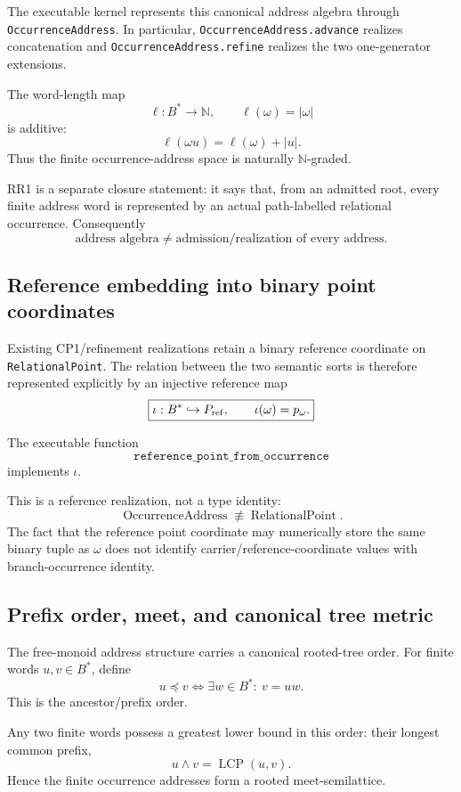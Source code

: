 \documentclass[11pt]{article}
\newcommand{\codeid}[1]{\nolinkurl{#1}}
\begin{document}
The executable kernel represents this canonical address algebra through
\texttt{OccurrenceAddress}. In particular,
\codeid{OccurrenceAddress.advance} realizes concatenation and
\codeid{OccurrenceAddress.refine} realizes the two one-generator extensions.

The word-length map
\[
\ell:B^*\to\mathbb N,
\qquad
\ell(\omega)=|\omega|
\]
is additive:
\[
\boxed{
\ell(\omega u)
=
\ell(\omega)+|u|.
}
\]
Thus the finite occurrence-address space is naturally \(\mathbb N\)-graded.

RR1 is a separate closure statement: it says that, from an admitted root,
every finite address word is represented by an actual path-labelled
relational occurrence. Consequently
\[
\boxed{
\text{address algebra}
\neq
\text{admission/realization of every address}.
}
\]

\subsection{Reference embedding into binary point coordinates}

Existing CP1/refinement realizations retain a binary reference coordinate on
\texttt{RelationalPoint}. The relation between the two semantic sorts is
therefore represented explicitly by an injective reference map
\[
\boxed{
\iota:
B^*
\hookrightarrow
P_{\rm ref},
\qquad
\iota(\omega)=p_\omega.
}
\]

The executable function
\[
\texttt{reference\_point\_from\_occurrence}
\]
implements \(\iota\).

This is a reference realization, not a type identity:
\[
\boxed{
\operatorname{OccurrenceAddress}
\not\equiv
\operatorname{RelationalPoint}.
}
\]
The fact that the reference point coordinate may numerically store the same
binary tuple as \(\omega\) does not identify carrier/reference-coordinate
values with branch-occurrence identity.

\subsection{Prefix order, meet, and canonical tree metric}

The free-monoid address structure carries a canonical rooted-tree order. For
finite words \(u,v\in B^*\), define
\[
\boxed{
u\preceq v
\Longleftrightarrow
\exists w\in B^*:\ v=uw.
}
\]
This is the ancestor/prefix order.

Any two finite words possess a greatest lower bound in this order: their
longest common prefix,
\[
\boxed{
u\wedge v
=
\operatorname{LCP}(u,v).
}
\]
Hence the finite occurrence addresses form a rooted meet-semilattice.
\end{document}
